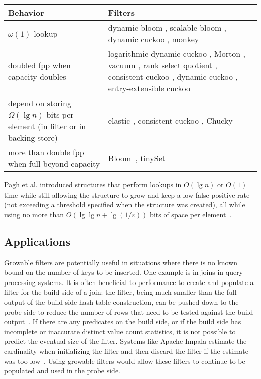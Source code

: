 \documentclass[letterpaper,twocolumn,10pt]{article}
\newcommand{\etal}{et al.}
\newcommand{\taffy}{stretchy}
\newcommand{\taffy}{taffy}
\begin{document}
\begin{figure*}
\begin{tabular}{|m{2in}|m{4.667in}|}
\hline {\bf Behavior} & {\bf Filters} \\
\hline $\omega(1)$ lookup & dynamic bloom \cite{dynamic-bloom}, scalable bloom \cite{scalable-bloom}, dynamic cuckoo \cite{dynamic-cuckoo}, monkey \cite{monkey}\\
\hline doubled fpp when capacity doubles & logarithmic dynamic cuckoo \cite{logarithm}, Morton \cite{morton-journal}, vacuum \cite{vacuum}, rank select quotient \cite{rsqf}, consistent cuckoo \cite{consistent-cuckoo}, dynamic cuckoo \cite{dynamic-cuckoo}, entry-extensible cuckoo \cite{entry-extensible} \\
\hline depend on storing $\Omega(\lg n)$ bits per element (in filter or in backing store) & elastic \cite{elastic}, consistent cuckoo \cite{consistent-cuckoo}, Chucky \cite{chucky} \\
\hline more than double fpp when full beyond capacity & Bloom~\cite{bloom}, tinySet~\cite{tinyset} \\
\hline
\end{tabular}
\caption{The filter types that exhibit various undesirable behavior in order to grow.
Some filters are in two lists.
Unlike \taffy{} filters, all filters listed in this table use either $\lg (1 / \varepsilon) + \omega(\lg \lg n)$ or $\omega(\lg(1/\varepsilon))$ bits to represent sets with size $n$ and false positive probability $\varepsilon$.
\label{prior-work-table}}
\end{figure*}

Pagh \etal{} introduced structures that perform lookups in $O(\lg n)$ or $O(1)$ time while still allowing the structure to grow and keep a low false positive rate (not exceeding a threshold specified when the structure was created), all while using no more than $O( \lg \lg n + \lg (1/\varepsilon))$ bits of space per element~\cite{psw}.

\subsection{Applications}

Growable filters are potentially useful in situations where there is no known bound on the number of keys to be inserted.
One example is in joins in query processing systems.
It is often beneficial to performance to create and populate a filter for the build side of a join:
the filter, being much smaller than the full output of the build-side hash table construction, can be pushed-down to the probe side to reduce the number of rows that need to be tested against the build output~\cite{tpch-filter}.
If there are any predicates on the build side, or if the build side has incomplete or inaccurate distinct value count statistics, it is not possible to predict the eventual size of the filter.
Systems like Apache Impala estimate the cardinality when initializing the filter and then discard the filter if the estimate was too low~\cite{impala}.
Using growable filters would allow these filters to continue to be populated and used in the probe side.
\end{document}
